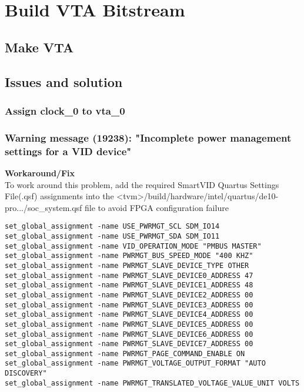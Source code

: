 \documentclass{article}
\begin{document}
\section{Build VTA Bitstream}
\subsection{Make VTA}
\subsection{Issues and solution}
\subsubsection{Assign clock\_0 to vta\_0}
\subsubsection{Warning message (19238): "Incomplete power management settings for a VID device"}
\textbf{Workaround/Fix}\\
To work around this problem, add the required SmartVID Quartus Settings File(.qsf) assignments into the <tvm>/build/hardware/intel/quartus/de10-pro.../soc\_system.qsf file to avoid FPGA configuration failure
\begin{lstlisting}
set_global_assignment -name USE_PWRMGT_SCL SDM_IO14
set_global_assignment -name USE_PWRMGT_SDA SDM_IO11
set_global_assignment -name VID_OPERATION_MODE "PMBUS MASTER"
set_global_assignment -name PWRMGT_BUS_SPEED_MODE "400 KHZ"
set_global_assignment -name PWRMGT_SLAVE_DEVICE_TYPE OTHER
set_global_assignment -name PWRMGT_SLAVE_DEVICE0_ADDRESS 47
set_global_assignment -name PWRMGT_SLAVE_DEVICE1_ADDRESS 48
set_global_assignment -name PWRMGT_SLAVE_DEVICE2_ADDRESS 00
set_global_assignment -name PWRMGT_SLAVE_DEVICE3_ADDRESS 00
set_global_assignment -name PWRMGT_SLAVE_DEVICE4_ADDRESS 00
set_global_assignment -name PWRMGT_SLAVE_DEVICE5_ADDRESS 00
set_global_assignment -name PWRMGT_SLAVE_DEVICE6_ADDRESS 00
set_global_assignment -name PWRMGT_SLAVE_DEVICE7_ADDRESS 00
set_global_assignment -name PWRMGT_PAGE_COMMAND_ENABLE ON
set_global_assignment -name PWRMGT_VOLTAGE_OUTPUT_FORMAT "AUTO DISCOVERY"
set_global_assignment -name PWRMGT_TRANSLATED_VOLTAGE_VALUE_UNIT VOLTS
\end{lstlisting}
\end{document}
